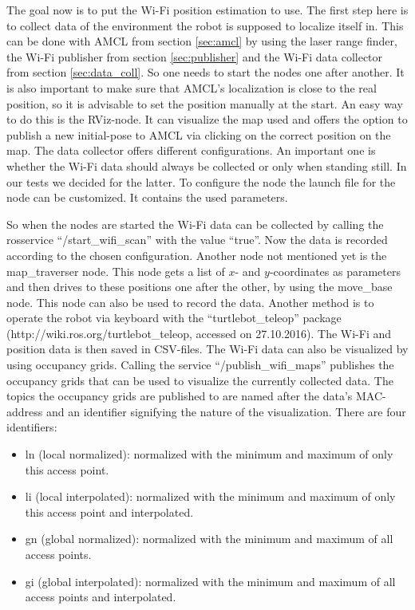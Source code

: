 The goal now is to put the Wi-Fi position estimation to use. The first step here is to collect data of the environment the robot is supposed to localize itself in. This can be done with AMCL from section \ref{sec:amcl} by using the laser range finder, the Wi-Fi publisher from section \ref{sec:publisher} and the Wi-Fi data collector from section \ref{sec:data_coll}. So one needs to start the nodes one after another. It is also important to make sure that AMCL's localization is close to the real position, so it is advisable to set the position manually at the start. An easy way to do this is the RViz-node. It can visualize the map used and offers the option to publish a new initial-pose to AMCL via clicking on the correct position on the map. The data collector offers different configurations. An important one is whether the Wi-Fi data should always be collected or only when standing still. In our tests we decided for the latter. To configure the node the launch file for the node can be customized. It contains the used parameters.

So when the nodes are started the Wi-Fi data can be collected by calling the rosservice ``/start\_wifi\_scan'' with the value ``true''. Now the data is recorded according to the chosen configuration. Another node not mentioned yet is the map\_traverser node. This node gets a list of $x$- and $y$-coordinates as parameters and then drives to these positions one after the other, by using the move\_base node. This node can also be used to record the data. Another method is to operate the robot via keyboard with the ``turtlebot\_teleop'' package (http://wiki.ros.org/turtlebot\_teleop, accessed on 27.10.2016). The Wi-Fi and position data is then saved in CSV-files. The Wi-Fi data can also be visualized by using occupancy grids. Calling the service ``/publish\_wifi\_maps'' publishes the occupancy grids that can be used to visualize the currently collected data. The topics the occupancy grids are published to are named after the data's \Gls{MAC-address} and an identifier signifying the nature of the visualization. There are four identifiers:
\begin{itemize}
\item ln (local normalized): normalized with the minimum and maximum of only this access point.
\item li (local interpolated): normalized with the minimum and maximum of only this access point and interpolated.
\item gn (global normalized): normalized with the minimum and maximum of all access points.
\item gi (global interpolated): normalized with the minimum and maximum of all access points and interpolated.
\end{itemize}

